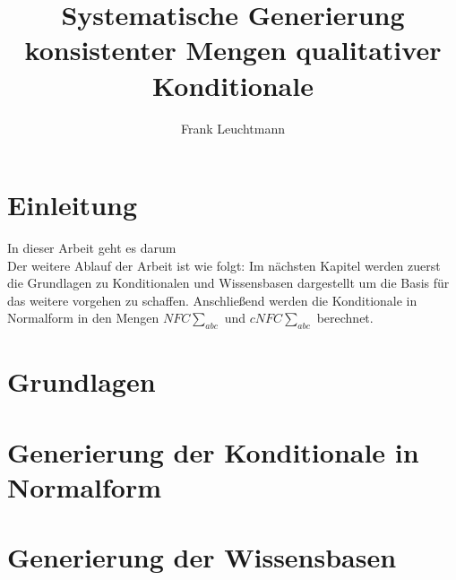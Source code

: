 \documentclass[12pt,a4paper]{article}
\author{Frank Leuchtmann}
\title{Systematische Generierung konsistenter Mengen qualitativer
Konditionale}
\begin{document}
\maketitle
\newpage
\tableofcontents
\newpage
\section{Einleitung}
In dieser Arbeit geht es darum
\\
Der weitere Ablauf der Arbeit ist wie folgt: Im nächsten Kapitel werden zuerst die Grundlagen zu Konditionalen und Wissensbasen dargestellt um die Basis für das weitere vorgehen zu schaffen. Anschließend werden die Konditionale in Normalform in den Mengen $NFC\sum_{abc}$ und $cNFC\sum_{abc}$ berechnet.
\section{Grundlagen}
\section{Generierung der Konditionale in Normalform}
\section{Generierung der Wissensbasen}
\end{document}
